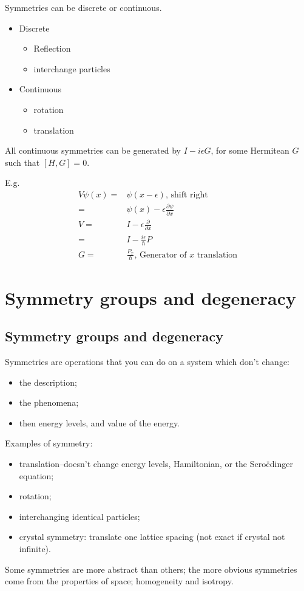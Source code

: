\documentclass[]{article}
\begin{document}
Symmetries can be discrete or continuous.

\begin{itemize}
	\item Discrete
	\begin{itemize}
		\item Reflection
		\item interchange particles
	\end{itemize}
	\item Continuous
	\begin{itemize}
		\item rotation
		\item translation
	\end{itemize}
\end{itemize}

All continuous symmetries can be generated by $I-i \epsilon G$, for some Hermitean $G$ such that $[H,G]=0$.

E.g.
\begin{align*}
V \psi(x) = & \psi(x-\epsilon)\text{, shift right}\\
=& \psi(x) - \epsilon \frac{\partial \psi}{\partial x}\\
V =& I -  \epsilon \frac{\partial }{\partial x}\\
=& I - \frac{i \epsilon}{\hslash}P\\
G =& \frac{P_x}{\hslash}\text{, Generator of $x$ translation}
\end{align*}


\section{Symmetry groups and degeneracy}\label{seq:symmetry:degeneracy}

\subsection{Symmetry groups and degeneracy}

Symmetries are operations that you can do on a system which don't change:
\begin{itemize}
	\item the description;
	\item the phenomena;
	\item then energy levels, and value of the energy.
\end{itemize}

Examples of symmetry:
\begin{itemize}
	\item translation--doesn't change energy levels, Hamiltonian, or the Scro\"edinger equation;
	\item rotation;
	\item interchanging identical particles;
	\item crystal symmetry: translate one lattice spacing (not exact if crystal not infinite).
\end{itemize}
Some symmetries are more abstract than others; the more obvious symmetries come from the properties of space; homogeneity and isotropy.
\end{document}
